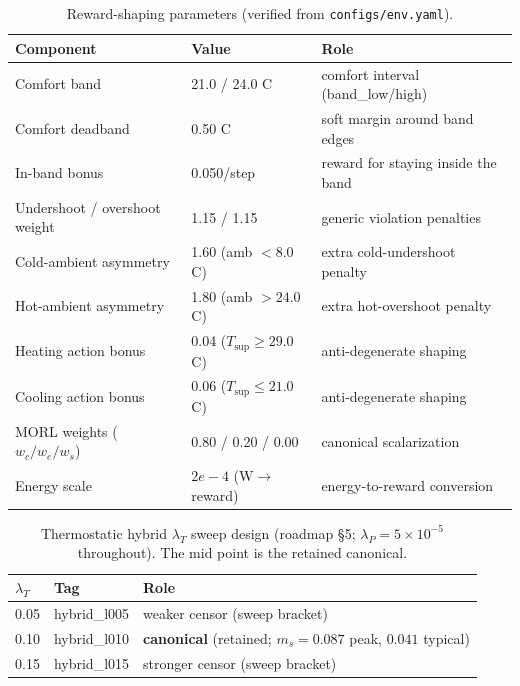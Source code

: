 \documentclass[11pt,a4paper]{article}
\begin{document}
\begin{table}[pos={!ht}]
\centering
\caption{Reward-shaping parameters (verified from \texttt{configs/env.yaml}).}
\label{tab:reward}
\small
\begin{tabularx}{\linewidth}{llX}
\toprule
Component & Value & Role \\
\midrule
Comfort band & 21.0 / 24.0 C & comfort interval (band\_low/high) \\
Comfort deadband & 0.50 C & soft margin around band edges \\
In-band bonus & 0.050/step & reward for staying inside the band \\
Undershoot / overshoot weight & 1.15 / 1.15 & generic violation penalties \\
Cold-ambient asymmetry & 1.60 (amb $<8.0$ C) & extra cold-undershoot penalty \\
Hot-ambient asymmetry & 1.80 (amb $>24.0$ C) & extra hot-overshoot penalty \\
Heating action bonus & 0.04 ($T_{\mathrm{sup}}\ge 29.0$ C) & anti-degenerate shaping \\
Cooling action bonus & 0.06 ($T_{\mathrm{sup}}\le 21.0$ C) & anti-degenerate shaping \\
MORL weights ($w_c/w_e/w_s$) & 0.80 / 0.20 / 0.00 & canonical scalarization \\
Energy scale & $2e-4$ (W$\to$reward) & energy-to-reward conversion \\
\bottomrule
\end{tabularx}
\end{table}

\begin{table}[pos={!ht}]
\centering
\caption{Thermostatic hybrid $\lambda_T$ sweep design (roadmap \S5; $\lambda_P=5\times10^{-5}$ throughout). The mid point is the retained canonical.}
\label{tab:hybrid_sweep}
\small
\begin{tabular}{lll}
\toprule
$\lambda_T$ & Tag & Role \\
\midrule
0.05 & hybrid\_l005 & weaker censor (sweep bracket) \\
0.10 & hybrid\_l010 & \textbf{canonical} (retained; $m_s=0.087$ peak, $0.041$ typical) \\
0.15 & hybrid\_l015 & stronger censor (sweep bracket) \\
\bottomrule
\end{tabular}
\end{table}
\end{document}

